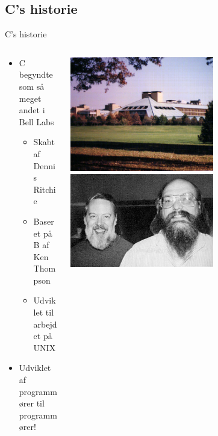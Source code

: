 \documentclass{beamer}
\begin{document}
\subsection{C's historie}

\begin{frame}{C's historie}
	\begin{columns}
	
		\begin{column}{0.5\textwidth}
		\begin{itemize}
		\item {C begyndte som så meget andet i Bell Labs}
			\begin{itemize}
			\item{Skabt af Dennis Ritchie} %
			\item{Baseret på B af Ken Thompson} %
			\item{Udviklet til arbejdet på UNIX}
			\end{itemize}
		\item {Udviklet af programmører til programmører!}
		\end{itemize}
		\end{column}
		
		\begin{column}{0.5\textwidth}
		\begin{center}
     		\includegraphics[width=0.6\textwidth]{assets/Lucent_HQ.png} 					\break
     		\break
     		\includegraphics[width=0.6\textwidth]{assets/Ken_n_dennis.png}
     	\end{center}
		\end{column}
		
	\end{columns}
\end{frame}
\end{document}
